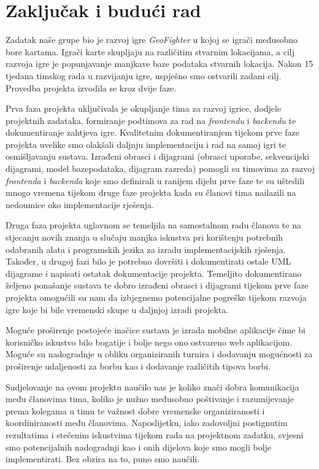 \chapter{Zaključak i budući rad}
		
		{Zadatak naše grupe bio je razvoj igre \textit{GeoFighter} u kojoj se igrači međusobno bore kartama. Igrači karte skupljaju na različitim stvarnim lokacijama, a cilj razvoja igre je popunjavanje manjkave baze podataka stvarnih lokacija. Nakon 15 tjedana timskog rada u razvijanju igre, uspješno smo ostvarili zadani cilj. Provedba projekta izvodila se kroz dvije faze.} 
		
		{Prva faza projekta uključivala je okupljanje tima za razvoj igrice, dodjele projektnih zadataka, formiranje podtimova za rad na \textit{frontendu} i \textit{backendu} te dokumentiranje zahtjeva igre. Kvalitetnim dokumentiranjem tijekom prve faze projekta uvelike smo olakšali daljnju implementaciju i rad na samoj igri te osmišljavanju sustava. Izrađeni obrasci i dijagrami (obrasci uporabe, sekvencijski dijagrami, model bazepodataka, dijagram razreda) pomogli su timovima za razvoj \textit{frontenda} i \textit{backenda} koje smo definirali u ranijem dijelu prve faze te su uštedili mnogo vremena tijekom druge faze projekta kada su članovi tima nailazili na nedoumice oko implementacije rješenja.}
			
		{Druga faza projekta uglavnom se temeljila na samostalnom radu članova te na stjecanju novih znanja u slučaju manjka iskustva pri korištenju potrebnih odabranih alata i programskih jezika za izradu implementacijskih rješenja. Također, u drugoj fazi bilo je potrebno dovršiti i dokumentirati ostale UML dijagrame i napisati ostatak dokumentacije projekta. Temeljito dokumentirano željeno ponašanje sustava te dobro izrađeni obrasci i dijagrami tijekom prve faze projekta omogućili su nam da izbjegnemo potencijalne pogreške tijekom razvoja igre koje bi bile vremenski skupe u daljnjoj izradi projekta.}
		
		{Moguće proširenje postojeće inačice sustava je izrada mobilne aplikacije čime bi korisničko iskustvo bilo bogatije i bolje nego ono ostvareno web aplikacijom. Moguće su nadogradnje u obliku organiziranih turnira i dodavanju mogućnosti za proširenje udaljenosti za borbu kao i dodavanje različitih tipova borbi.}
		
		{Sudjelovanje na ovom projektu naučilo nas je koliko znači dobra komunikacija među članovima tima, koliko je nužno međusobno poštivanje i razumijevanje prema kolegama u timu te važnost dobre vremenske organiziranosti i koordiniranosti među članovima. Naposlijetku, iako zadovoljni postignutim rezultatima i stečenim iskustvima tijekom rada na projektnom zadatku, svjesni smo potencijalnih nadogradnji kao i onih dijelova koje smo mogli bolje implementirati. Bez obzira na to, puno smo naučili.}\textsc{}
		
		\eject 